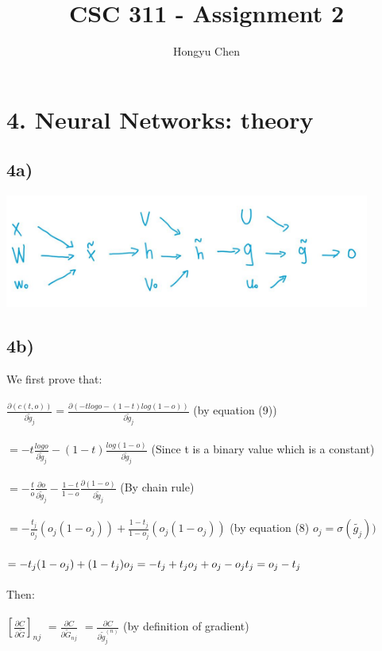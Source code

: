 \documentclass{article}  %
\author{Hongyu Chen}
\title{CSC 311 - Assignment 2}
\begin{document}
 
    \maketitle
   \section{4. Neural Networks: theory} 

        \subsection{4a)} \includegraphics[width=0.90\textwidth]{./4a.JPG} 
		 \subsection{4b)}
		 We first prove that:\\\\
		 $\frac{\partial(c(t,o))}{\partial\tilde{g}_{j}} 
		 = \frac{\partial (-tlogo-(1-t)log(1-o))}{\partial\tilde{g}_{j}}$    (by equation (9)) \\\\
		 $= -t \frac{logo}{\partial\tilde{g}_{j}} - (1-t)\frac{log(1-o)}{\partial\tilde{g}_{j}}$		  (Since t is a binary value which is a constant)\\\\
		 $ = -\frac{t}{o}\frac{\partial o}{\partial\tilde{g}_{j}} - \frac{1-t}{1-o}\frac{\partial(1-o)}{\partial\tilde{g}_{j}}$ (By chain rule)\\\\
		 $ = -\frac{t_{j}}{o_{j}}(o_{j}(1-o_{j})) + \frac{1-t_{j}}{1-o_{j}}(o_{j}(1-o_{j}))$ (by equation (8) $o_{j} = \sigma(\tilde{g_{j}}))$\\\\
		 $ = -t_{j}(1-o_{j}) + (1-t_{j})o_{j} \\\\ = -t_{j} + t_{j}o_{j} + o_{j} - o_{j}t_{j} \\\\ = o_{j}-t_{j}$\\\\
		 Then:\\\\
		 $[\frac{\partial C}{\partial \tilde{G}}]_{nj} $ 
		 $= \frac{\partial C}{\partial \tilde{G}_{nj}}$ 
		 $= \frac{\partial C}{\partial \tilde{g}^{(n)}_{j}}$ (by definition of gradient)\\\\
\end{document}
